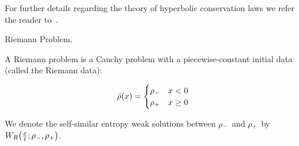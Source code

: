 For further details regarding the theory of hyperbolic conservation laws we refer the reader to~\cite{garavello2006traffic,Evans1998}.

%
%
%
%
%
\begin{defn}
	\label{def:Riemann-Problem}Riemann Problem.
		
	A Riemann problem is a Cauchy problem with a piecewise-constant initial data (called the Riemann data):
		
	\[
		\bar{\rho}(x)=\begin{cases}
		\rho_{-} & x<0\\
		\rho_{+} & x\ge 0
		\end{cases}
	\]
\end{defn}
We denote the self-similar entropy weak solutions between $\rho_{-}$ and $\rho_{+}$ by $\ss{\frac{x}{t}}{\cvar_{-}}{\cvar_{+}}$.


